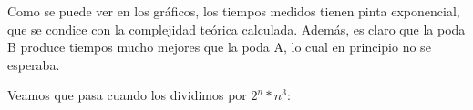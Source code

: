 %
%

Como se puede ver en los gráficos, los tiempos medidos tienen pinta exponencial, que se condice con la complejidad teórica calculada. Además, es claro que la poda B produce tiempos mucho mejores que la poda A, lo cual en principio no se esperaba.

Veamos que pasa cuando los dividimos por $2^n*n^3$:

